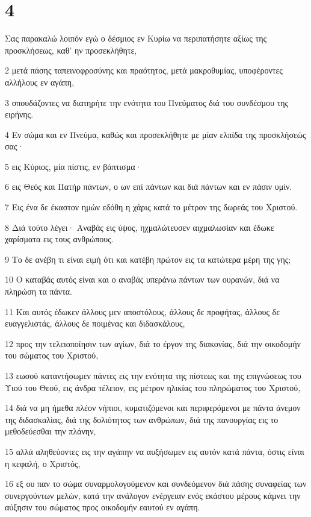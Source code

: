 \chapter{4}

\par Σας παρακαλώ λοιπόν εγώ ο δέσμιος εν Κυρίω να περιπατήσητε αξίως της προσκλήσεως, καθ' ην προσεκλήθητε,
\par 2 μετά πάσης ταπεινοφροσύνης και πραότητος, μετά μακροθυμίας, υποφέροντες αλλήλους εν αγάπη,
\par 3 σπουδάζοντες να διατηρήτε την ενότητα του Πνεύματος διά του συνδέσμου της ειρήνης.
\par 4 Εν σώμα και εν Πνεύμα, καθώς και προσεκλήθητε με μίαν ελπίδα της προσκλήσεώς σας·
\par 5 εις Κύριος, μία πίστις, εν βάπτισμα·
\par 6 εις Θεός και Πατήρ πάντων, ο ων επί πάντων και διά πάντων και εν πάσιν υμίν.
\par 7 Εις ένα δε έκαστον ημών εδόθη η χάρις κατά το μέτρον της δωρεάς του Χριστού.
\par 8 Διά τούτο λέγει· Αναβάς εις ύψος, ηχμαλώτευσεν αιχμαλωσίαν και έδωκε χαρίσματα εις τους ανθρώπους.
\par 9 Το δε ανέβη τι είναι ειμή ότι και κατέβη πρώτον εις τα κατώτερα μέρη της γης;
\par 10 Ο καταβάς αυτός είναι και ο αναβάς υπεράνω πάντων των ουρανών, διά να πληρώση τα πάντα.
\par 11 Και αυτός έδωκεν άλλους μεν αποστόλους, άλλους δε προφήτας, άλλους δε ευαγγελιστάς, άλλους δε ποιμένας και διδασκάλους,
\par 12 προς την τελειοποίησιν των αγίων, διά το έργον της διακονίας, διά την οικοδομήν του σώματος του Χριστού,
\par 13 εωσού καταντήσωμεν πάντες εις την ενότητα της πίστεως και της επιγνώσεως του Υιού του Θεού, εις άνδρα τέλειον, εις μέτρον ηλικίας του πληρώματος του Χριστού,
\par 14 διά να μη ήμεθα πλέον νήπιοι, κυματιζόμενοι και περιφερόμενοι με πάντα άνεμον της διδασκαλίας, διά της δολιότητος των ανθρώπων, διά της πανουργίας εις το μεθοδεύεσθαι την πλάνην,
\par 15 αλλά αληθεύοντες εις την αγάπην να αυξήσωμεν εις αυτόν κατά πάντα, όστις είναι η κεφαλή, ο Χριστός,
\par 16 εξ ου παν το σώμα συναρμολογούμενον και συνδεόμενον διά πάσης συναφείας των συνεργούντων μελών, κατά την ανάλογον ενέργειαν ενός εκάστου μέρους κάμνει την αύξησιν του σώματος προς οικοδομήν εαυτού εν αγάπη.
